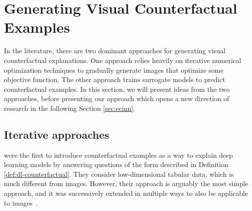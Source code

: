 \documentclass[11pt,a4paper,twoside,openright,final]{memoir}
\begin{document}


\section{Generating Visual Counterfactual Examples}
In the literature, there are two dominant approaches for generating visual counterfactual explanations.
One approach relies heavily on iterative numerical optimization techniques to gradually generate images that optimize some objective function.
The other approach trains surrogate models to predict counterfactual examples. 
In this section, we will present ideas from the two approaches, before presenting our approach which opens a new direction of research in the following Section \ref{sec:ecinn}. 
\subsection{Iterative approaches}
\citet{Wachter2017} were the first to introduce counterfactual examples as a way to explain deep learning models by answering questions of the form described in Definition \ref{def:dl-counterfactual}. 
They consider low-dimensional tabular data, which is much different from images.
However, their approach is arguably the most simple approach, and it was successively extended in multiple ways to also be applicable to images~\cite{Dhurandhar2018, VanLooveren2019}. 
\end{document}
